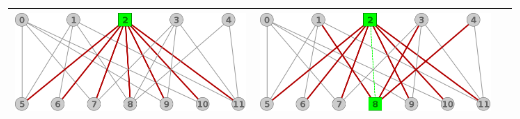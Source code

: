 \begin{center}
\begin{tabular}{ |c||c||c| }
			\includegraphics[scale = 0.2]{img/ej3/constructiva_golosa/bipartito1_st01.png} &
			\includegraphics[scale = 0.2]{img/ej3/constructiva_golosa/bipartito1_st02.png} \\
			\hline
		\end{tabular}
	\end{center}
